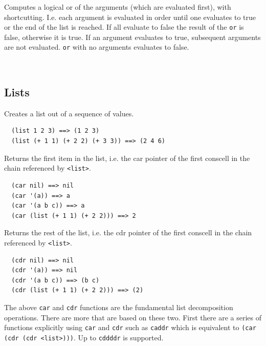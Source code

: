 \documentclass[12pt]{article}
\begin{document}

Computes a logical or of the arguments (which are evaluated first),
with shortcutting. I.e. each argument is evaluated in order until one
evaluates to true or the end of the list is reached. If all evaluate
to false the result of the \verb|or| is false, otherwise it is true.
If an argument evaluates to true, subsequent arguments are not
evaluated. \verb|or| with no arguments evaluates to false.

\begin{verbatim}
  
\end{verbatim}

\subsection{Lists}


Creates a list out of a sequence of values.

\begin{verbatim}
  (list 1 2 3) ==> (1 2 3)
  (list (+ 1 1) (+ 2 2) (+ 3 3)) ==> (2 4 6)
\end{verbatim}


Returns the first item in the list, i.e. the car pointer of the first
conscell in the chain referenced by \verb|<list>|.

\begin{verbatim}
  (car nil) ==> nil
  (car '(a)) ==> a
  (car '(a b c)) ==> a
  (car (list (+ 1 1) (+ 2 2))) ==> 2
\end{verbatim}


Returns the rest of the list, i.e. the cdr pointer of the first
conscell in the chain referenced by \verb|<list>|.

\begin{verbatim}
  (cdr nil) ==> nil
  (cdr '(a)) ==> nil
  (cdr '(a b c)) ==> (b c)  
  (cdr (list (+ 1 1) (+ 2 2))) ==> (2)
\end{verbatim}

The above \verb|car| and \verb|cdr| functions are the fundamental list
decomposition operations. There are more that are based on these two.
First there are a series of functions explicitly using \verb|car| and
\verb|cdr| such as \verb|caddr| which is equivalent to
\verb|(car (cdr (cdr <list>)))|. Up to \verb|cddddr| is supported.
\end{document}
